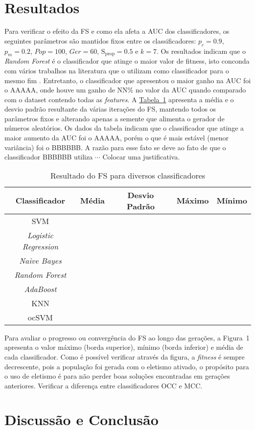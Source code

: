 \documentclass{paper}
\renewcommand{\it}[1]{\textit{#1}} %
\begin{document}
\section{Resultados} \label{sec_resultados}
Para verificar o efeito da FS e como ela afeta a AUC dos classificadores, os
seguintes parâmetros são mantidos fixos entre os classificadores: $p_c=0.9$,
$p_m=0.2$, $Pop=100$, $Ger=60$, $\mathrm{S_{prop}=0.5}$ e $k=7$. Os resultados
indicam que o \textit{Random Forest} é o classificador que atinge o maior valor
de fitness, isto conconda com vários trabalhos na literatura que o utilizam como
classificador para o mesmo fim \cite{Bessi2016}. Entretanto, o classificador que
apresentou o maior ganho na AUC foi o AAAAA, onde houve um ganho de NN\% no
valor da AUC quando comparado com o dataset contendo todas as \it{features}. A
\hyperref[tbl:auc]{Tabela~\ref*{tbl:auc}} apresenta a média e o desvio padrão
resultante da várias iterações do FS, mantendo todos os parâmetros fixos e
alterando apenas a semente que alimenta o gerador de números aleatórios. Os
dados da tabela indicam que o classificador que atinge a maior aumento da AUC
foi o AAAAA, porém o que é mais estável (menor variância) foi o BBBBBB. A razão
para esse fato se deve ao fato de que o classificador BBBBBB utiliza $\cdots$
{\color{red} Colocar uma justificativa.}

\begin{table}[h]
  \caption{Resultado do FS para diversos classificadores}\label{tbl:auc}
  \centering
  \begin{tabular}{c | c | c | c | c}
    \toprule
    Classificador & Média & Desvio Padrão & Máximo & Mínimo \\
    \midrule
    SVM & & & & \\
    \it{Logistic Regression} & & & & \\
    \it{Naive Bayes} & & & & \\
    \it{Random Forest} & & & &\\
    \it{AdaBoost} & & & &\\
    KNN & & & &\\
    ocSVM & & & &\\
    \bottomrule
  \end{tabular}
\end{table}

Para avaliar o progresso ou convergência do FS ao longo das gerações, a Figura~1
apresenta o valor máximo (borda superior), mínimo (borda inferior) e média de
cada classificador. Como é possível verificar através da figura, a \it{fitness}
é sempre decrescente, pois a população foi gerada com o eletismo ativado, o
propósito para o uso de eletismo é para não perder boas soluções encontradas em
gerações anteriores. {\color{red} Verificar a diferença entre classificadores
  OCC e MCC}.


\section{Discussão e Conclusão} \label{sec_conclusao}

 
\end{document}
